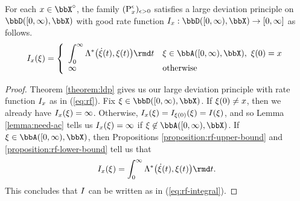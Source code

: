\begin{theorem}
  \label{theorem:ldp-integral}
  For each $\stateVar \in \stateSpace^\circ$, the family $({\operatorname{P}}^\epsilon_x)_{\epsilon>0}$ satisfies a large deviation principle on $\pathSpace{[0,\infty)}{\stateSpace}$ with good rate function $\rf_\stateVar: \pathSpace{[0,\infty)}{\stateSpace} \rightarrow [0,\infty]$ as follows.
  \begin{equation}
    \label{eq:rf-integral}
    \rf_\stateVar(\pathVar) = \left\{\begin{array}{ll}
      \displaystyle\int_0^\infty \ode^*\big(\dot\pathVar(t), \pathVar(t)\big) \rmd t & \pathVar \in \acpathSpace{[0,\infty)}{\stateSpace}, ~ \pathVar(0) = \stateVar \\
      \infty & \text{otherwise}
    \end{array}\right.
  \end{equation}
\end{theorem}
\begin{proof}
  Theorem \ref{theorem:ldp} gives us our large deviation principle with rate function $I_x$ as in (\ref{eq:rf}).
  Fix $\pathVar \in \pathSpace{[0,\infty)}{\stateSpace}$.
  If $\xi(0) \neq x$, then we already have $I_x(\xi)=\infty$.
  Otherwise, $I_x(\xi) = I_{\xi(0)}(\xi) = I(\xi)$, and so Lemma \ref{lemma:need-ac} tells us $I_x(\xi) = \infty$ if $\pathVar \not\in \acpathSpace{[0,\infty)}{\stateSpace}$.
  If $\pathVar \in \acpathSpace{[0,\infty)}{\stateSpace}$, then Propositions \ref{proposition:rf-upper-bound} and \ref{proposition:rf-lower-bound} tell us that
  \begin{equation*}
    \rf_\stateVar(\pathVar) = \int_0^\infty \ode^*\big( \dot\pathVar(t), \pathVar(t) \big) \rmd t.
  \end{equation*}
  This concludes that $I$ can be written as in (\ref{eq:rf-integral}).
\end{proof}
